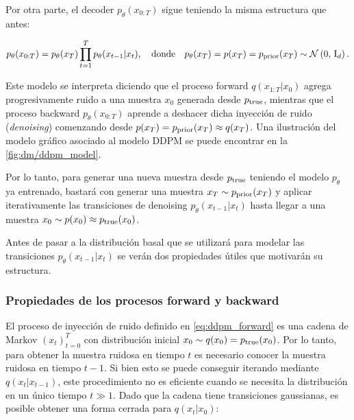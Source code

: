 Por otra parte, el decoder $p_\theta(x_{0:T})$ sigue teniendo la misma estructura que antes:

\begin{equation}
    \label{eq:ddpm_backward}
    p_\theta(x_{0:T}) = p_\theta(x_T)\prod_{t=1}^{T} p_\theta(x_{t-1}|x_t),
    \quad\text{donde}\quad
    p_\theta(x_T) = p(x_T) = p_{\operatorname{prior}}(x_T) \sim \mathcal{N}\left(0,\,\operatorname{I}_{d}\right).
\end{equation}

Este modelo se interpreta diciendo que el proceso forward $q(x_{1:T}|x_0)$ agrega progresivamente ruido a una muestra $x_0$ generada desde $p_{\operatorname{true}}$, mientras que el proceso backward $p_\theta(x_{0:T})$ aprende a deshacer dicha inyección de ruido (\textit{denoising}) comenzando desde $p(x_T)= p_{\operatorname{prior}}(x_T)\approx q(x_T)$. Una ilustración del modelo gráfico asociado al modelo DDPM se puede encontrar en la \autoref{fig:dm/ddpm_model}.


Por lo tanto, para generar una nueva muestra desde $p_{\operatorname{true}}$ teniendo el modelo $p_\theta$ ya entrenado, bastará con generar una muestra $x_T\sim p_{\operatorname{prior}}(x_T)$ y aplicar iterativamente las transiciones de denoising $p_\theta(x_{t-1}|x_t)$ hasta llegar a una muestra $x_0\sim p(x_0)\approx p_{\operatorname{true}}(x_0)$.

Antes de pasar a la distribución basal que se utilizará para modelar las transiciones $p_\theta(x_{t-1}|x_t)$ se verán dos propiedades útiles que motivarán su estructura.

\subsubsection{Propiedades de los procesos forward y backward}

El proceso de inyección de ruido definido en \eqref{eq:ddpm_forward} es una cadena de Markov $(x_t)_{t=0}^T$ con distribución inicial $x_0\sim q(x_0)=p_{\operatorname{true}}(x_0)$. Por lo tanto, para obtener la muestra ruidosa en tiempo $t$ es necesario conocer la muestra ruidosa en tiempo $t-1$. Si bien esto se puede conseguir iterando mediante $q(x_t|x_{t-1})$, este procedimiento no es eficiente cuando se necesita la distribución en un único tiempo $t\gg 1$. Dado que la cadena tiene transiciones gaussianas, es posible obtener una forma cerrada para $q(x_t|x_0)$:

